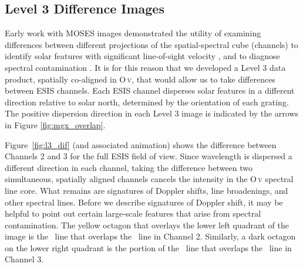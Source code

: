     \subsection{Level 3 Difference Images} \label{sec:dif_images} 
    	Early work with MOSES images demonstrated the utility of examining differences between different projections of the spatial-spectral cube (channels) to identify solar features with significant line-of-sight velocity \citep{Fox2010,Fox2011,Rust2017,Rust2019}, and to diagnose spectral contamination \citep{Rust2017, Rust2019}.
    	It is for this reason that we developed a Level 3 data product, spatially co-aligned in O\,\textsc{v}, %
    	that would allow us to take differences between ESIS channels.
    	Each ESIS channel disperses solar features in a different direction relative to solar north, determined by the orientation of each grating.
    	The positive dispersion direction in each Level 3 image is indicated by the arrows  in Figure \ref{fig:mgx_overlap}.
    	
    	Figure~\ref{fig:l3_dif} (and associated animation) shows the difference between Channels 2 and 3 for the full ESIS field of view.  
    	Since wavelength is dispersed a different direction in each channel, taking the difference between two
    	simultaneous, spatially aligned channels cancels the intensity in the O\,\textsc{v} spectral line core. 
    	What remains are signatures of Doppler shifts, line broadenings, and other spectral lines.
    	Before we describe signatures of Doppler shift, it may be helpful to point out certain large-scale features that arise from spectral contamination.
    	The %
    	yellow octagon that overlays the lower left quadrant of the image is the \mgxbright \ line that overlaps the \ov \ line in Channel 2. Similarly, a dark octagon on the lower right quadrant is the portion of the \mgxbright \ line that overlaps the \ov \ line in Channel 3.
    	
